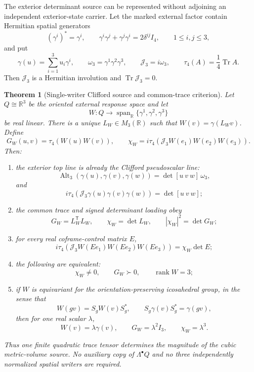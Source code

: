 \documentclass[11pt]{article}
\newtheorem{theorem}{Theorem}[section]
\theoremstyle{definition}
\theoremstyle{remark}
\newcommand{\R}{\mathbb R}
\newcommand{\Tr}{\operatorname{Tr}}
\newcommand{\rank}{\operatorname{rank}}
\newcommand{\Span}{\operatorname{span}}
\begin{document}
The exterior determinant source can be represented without adjoining an
independent exterior-state carrier.  Let the marked external factor contain
Hermitian spatial generators
\[
 (\gamma^i)^*=\gamma^i,
 \qquad
 \gamma^i\gamma^j+\gamma^j\gamma^i=2\delta^{ij}I_4,
 \qquad 1\le i,j\le3,
\]
and put
\[
 \gamma(u)=\sum_{i=1}^3u_i\gamma^i,
 \qquad
 \omega_3=\gamma^1\gamma^2\gamma^3,
 \qquad
 \mathcal J_3=i\omega_3,
 \qquad
 \tau_4(A)=\frac14\Tr A.
\]
Then $\mathcal J_3$ is a Hermitian involution and $\Tr\mathcal J_3=0$.

\begin{theorem}[Single-writer Clifford source and common-trace criterion]
\label{thm:single-writer-clifford-master}
Let $Q\cong\R^3$ be the oriented external response space and let
\[
 W:Q\longrightarrow
 \Span_{\R}\{\gamma^1,\gamma^2,\gamma^3\}
\]
be real linear.  There is a unique $L_W\in M_3(\R)$ such that
$W(v)=\gamma(L_Wv)$.  Define
\[
 G_W(u,v)=\tau_4(W(u)W(v)),
 \qquad
 \chi_W=i\tau_4\!\left(
 \mathcal J_3W(e_1)W(e_2)W(e_3)\right).
\]
Then:
\begin{enumerate}[label=\textup{(\roman*)},leftmargin=2.7em]
\item the exterior top line is already the Clifford pseudoscalar line:
      \[
       \operatorname{Alt}_3(\gamma(u),\gamma(v),\gamma(w))
       =\det[u\ v\ w]\,\omega_3,
      \]
      and
      \[
       i\tau_4\!\left(
       \mathcal J_3\gamma(u)\gamma(v)\gamma(w)\right)
       =\det[u\ v\ w];
      \]
\item the common trace and signed determinant loading obey
      \[
       \boxed{G_W=L_W^{\mathsf T}L_W,\qquad
       \chi_W=\det L_W,\qquad |\chi_W|^2=\det G_W;}
      \]
\item for every real coframe-control matrix $E$,
      \[
       \boxed{
       i\tau_4\!\left(
       \mathcal J_3W(Ee_1)W(Ee_2)W(Ee_3)\right)
       =\chi_W\det E;}
      \]
\item the following are equivalent:
      \[
       \chi_W\ne0,
       \qquad G_W\succ0,
       \qquad \rank W=3;
      \]
\item if $W$ is equivariant for the orientation-preserving icosahedral group,
      in the sense that
      \[
       W(gv)=S_gW(v)S_g^*,
       \qquad S_g\gamma(v)S_g^*=\gamma(gv),
      \]
      then for one real scalar $\lambda$,
      \[
       \boxed{W(v)=\lambda\gamma(v),\qquad
       G_W=\lambda^2I_3,\qquad \chi_W=\lambda^3.}
      \]
\end{enumerate}
Thus one finite quadratic trace tensor determines the magnitude of the cubic
metric-volume source.  No auxiliary copy of $\Lambda^\bullet Q$ and no three
independently normalized spatial writers are required.
\end{theorem}
\end{document}
